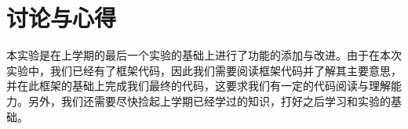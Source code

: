 \section{讨论与心得}
本实验是在上学期的最后一个实验的基础上进行了功能的添加与改进。由于在本次实验中，我们已经有了框架代码，因此我们需要阅读框架代码并了解其主要意思，并在此框架的基础上完成我们最终的代码，这要求我们有一定的代码阅读与理解能力。另外，我们还需要尽快捡起上学期已经学过的知识，打好之后学习和实验的基础。
